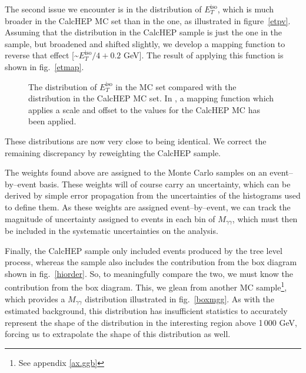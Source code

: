 The second issue we encounter is in the distribution of $E_T^\text{iso}$, which is much broader in the CalcHEP MC set than in the \atlas{} one, as illustrated in figure~\ref{etpv}. Assuming that the distribution in the CalcHEP sample is just the one in the \atlas{} sample, but broadened and shifted slightly, we develop a mapping function to reverse that effect [\~$E_T^\text{iso}/4+0.2$ GeV]. The result of applying this function is shown in fig.~\ref{etmap}.

\begin{figure}[htp]
\begin{minipage}[b]{.49\textwidth}
\begin{infilsf} \tiny 

\end{infilsf}
\end{minipage}
\hfill
\begin{minipage}[b]{.49\textwidth}
\begin{infilsf} \tiny 

\end{infilsf}
\end{minipage}
\begin{minipage}[b]{.49\textwidth}
\end{minipage}\hfill
\begin{minipage}[b]{.49\textwidth}
\end{minipage}
\caption{The distribution of $E_T^\text{iso}$ in the \atlas{} MC set compared with the distribution in the CalcHEP MC set. In , a mapping function which applies a scale and offset to the values for the CalcHEP MC has been applied.}
\end{figure}

These distributions are now very close to being identical. We correct the remaining discrepancy by reweighting the CalcHEP sample.

The weights found above are assigned to the Monte Carlo samples on an event--by--event basis. These weights will of course carry an uncertainty, which can be derived by simple error propagation from the uncertainties of the histograms used to define them. As these weights are assigned event--by--event, we can track the magnitude of uncertainty assigned to events in each bin of $M_{\gamma\gamma}$, which must then be included in the systematic uncertainties on the analysis.

Finally, the CalcHEP sample only included events produced by the tree level process, whereas the \atlas{} sample also includes the contribution from the box diagram shown in fig.~\ref{hiorder}. So, to meaningfully compare the two, we must know the contribution from the box diagram. This, we glean from another \atlas{} MC sample\footnote{See appendix \ref{ax.ggb}}, which provides a $M_{\gamma\gamma}$ distribution illustrated in fig.~\ref{boxmgg}. As with the estimated background, this distribution has insufficient statistics to accurately represent the shape of the distribution in the interesting region above 1\,000 GeV, forcing us to extrapolate the shape of this distribution as well.

